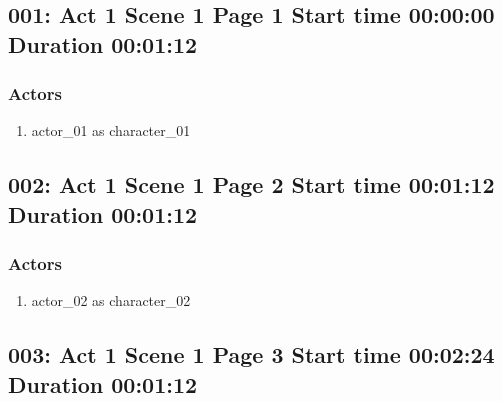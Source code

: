 \subsection{001: Act 1 Scene 1 Page 1 Start time 00:00:00 Duration 00:01:12}

\subsubsection{Actors}
\begin{enumerate}
\item actor\_01 as character\_01
\end{enumerate}


\subsection{002: Act 1 Scene 1 Page 2 Start time 00:01:12 Duration 00:01:12}

\subsubsection{Actors}
\begin{enumerate}
\item actor\_02 as character\_02
\end{enumerate}


\subsection{003: Act 1 Scene 1 Page 3 Start time 00:02:24 Duration 00:01:12}

